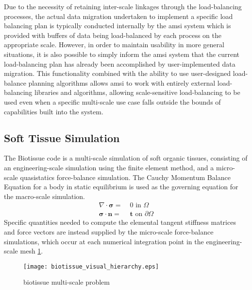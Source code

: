 \documentclass[11pt]{siamltex1213}
\begin{document}
Due to the necessity of retaining inter-scale linkages through the load-balancing processes, the actual data migration undertaken to implement a specific load balancing plan is typically conducted internally by the amsi system which is provided with buffers of data being load-balanced by each process on the appropriate scale. However, in order to maintain usability in more general situations, it is also possible to simply inform the amsi system that the current load-balancing plan has already been accomplished by user-implemented data migration. This functionality combined with the ability to use user-designed load-balance planning algorithms allows amsi to work with entirely external load-balancing libraries and algorithms, allowing scale-sensitive load-balancing to be used even when a specific multi-scale use case falls outside the bounds of capabilities built into the system.

\subsection{Soft Tissue Simulation}\label{biotissue}
The Biotissue code is a multi-scale simulation of soft organic tissues, consisting of an engineering-scale simulation using the finite element method, and a micro-scale quasistatics force-balance simulation. The Cauchy Momentum Balance Equation for a body in static equilibrium is used as the governing equation for the macro-scale simulation. 
%
\begin{align}
\nabla \cdot \pmb{\sigma} =& \; 0 \text{ in } \Omega \label{momentum_balance} \\
\pmb{\sigma} \cdot \pmb{n} =& \; \pmb{t} \text{ on } \partial \Omega \nonumber
\end{align}
%
Specific quantities needed to compute the elemental tangent stiffness matrices and force vectors are instead supplied by the micro-scale force-balance simulations, which occur at each numerical integration point in the engineering-scale mesh \ref{biotissue_hierarchy}. 

\begin{figure}
  \begin{center}
    \texttt{[image: biotissue\_visual\_hierarchy.eps]}
  \end{center}
  \caption{\small biotissue multi-scale problem}
  \label{biotissue_hierarchy}
\end{figure}
\end{document}
